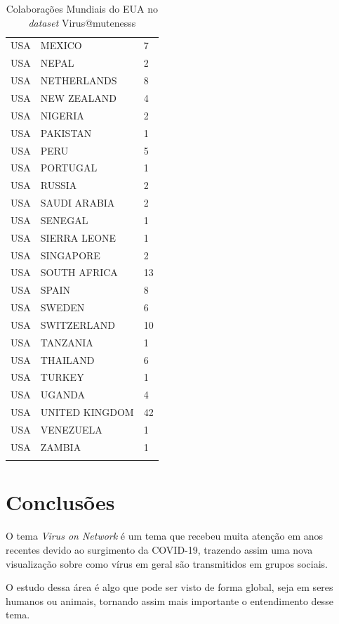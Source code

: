 \begin{longtable}{|l|l|l|}
USA  & MEXICO         & 7         \\
USA  & NEPAL          & 2         \\
USA  & NETHERLANDS    & 8         \\
USA  & NEW ZEALAND    & 4         \\
USA  & NIGERIA        & 2         \\
USA  & PAKISTAN       & 1         \\
USA  & PERU           & 5         \\
USA  & PORTUGAL       & 1         \\
USA  & RUSSIA         & 2         \\
USA  & SAUDI ARABIA   & 2         \\
USA  & SENEGAL        & 1         \\
USA  & SIERRA LEONE   & 1         \\
USA  & SINGAPORE      & 2         \\
USA  & SOUTH AFRICA   & 13        \\
USA  & SPAIN          & 8         \\
USA  & SWEDEN         & 6         \\
USA  & SWITZERLAND    & 10        \\
USA  & TANZANIA       & 1         \\
USA  & THAILAND       & 6         \\
USA  & TURKEY         & 1         \\
USA  & UGANDA         & 4         \\
USA  & UNITED KINGDOM & 42        \\
USA  & VENEZUELA      & 1         \\
USA  & ZAMBIA         & 1         \\ \hline
    \caption{Colaborações Mundiais do EUA no \textit{dataset} Virus@mutenesss}
    \label{tab:USAWorldColab:Virus@mutenesss}
\end{longtable}

\section{Conclusões}

O tema \textit{Virus on Network} é um tema que recebeu muita atenção em anos recentes devido ao surgimento da COVID-19, trazendo assim uma nova visualização sobre como vírus em geral são transmitidos em grupos sociais.

O estudo dessa área é algo que pode ser visto de forma global, seja em seres humanos ou animais, tornando assim mais importante o entendimento desse tema.

